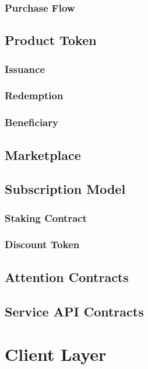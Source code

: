 \documentclass[letterpaper,11pt]{article}
\begin{document}
\subsubsection{Purchase Flow}

\subsection{Product Token}

\subsubsection{Issuance}

\subsubsection{Redemption}

\subsubsection{Beneficiary}

\subsection{Marketplace}

\subsection{Subscription Model}

\subsubsection{Staking Contract}

\subsubsection{Discount Token}

\subsection{Attention Contracts}

\subsection{Service API Contracts}

\section{Client Layer}
\end{document}
